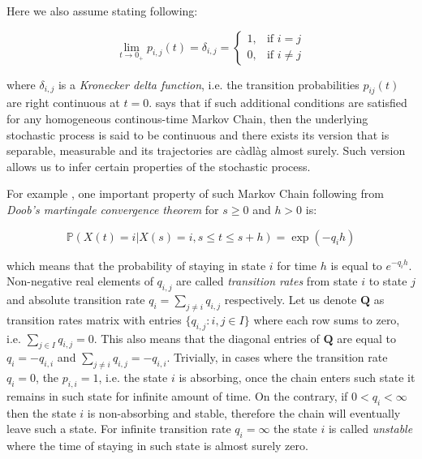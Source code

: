 Here we also assume \citep{Gallager2013} stating following:

\begin{equation}
    \lim_{t \to 0_{+}} p_{i,j}(t) = \delta_{i,j} = 
        \begin{cases}
            1, & \text{if } i = j\\
            0, & \text{if } i \neq j
        \end{cases}
\end{equation}

where $\delta_{i,j}$ is a \textit{Kronecker delta function}, i.e. the transition probabilities $p_{ij}(t)$ are right continuous at $t=0$. \citep{Norris2012} says that if such additional conditions are satisfied for any homogeneous continous-time Markov Chain, 
then the underlying stochastic process is said to be continuous and there exists its version that is separable, measurable and its trajectories are càdlàg almost surely. Such version allows us to infer 
certain properties of the stochastic process.

For example \citep{Gidi2018}, one important property of such Markov Chain following from \textit{Doob's martingale convergence theorem} for $s \geq 0$ and $h>0$ is:

\begin{equation}
    \mathbb{P}(X(t) = i|X(s)=i, s \leq t \leq s+h) = \exp(-{q_i}h)
\end{equation}

which means that the probability of staying in state $i$ for time $h$ is equal to $e^{-{q_i}h}$. 
Non-negative real elements of $q_{i,j}$ are called \textit{transition rates} from state $i$ to state $j$ and absolute transition 
rate $q_i = \sum_{j \neq i} q_{i,j}$ respectively. Let us denote $\textbf{Q}$ as transition rates matrix with entries $\{q_{i,j}: i,j \in I\}$ where each row sums to zero, i.e. $\sum_{j \in I} q_{i,j} = 0$. 
This also means that the diagonal entries of $\textbf{Q}$ are equal to $q_i = -q_{i,i}$ and $\sum_{j \neq i} q_{i,j} = -q_{i,i}$. 
Trivially, in cases where the transition rate $q_i=0$, the $p_{i,i} = 1$, i.e. the state $i$ is absorbing, 
once the chain enters such state it remains in such state for infinite amount of time. On the contrary, if $0 < q_i < \infty$ then the state $i$ is non-absorbing and stable, therefore
the chain will eventually leave such a state. For infinite transition rate $q_i = \infty$ the state $i$ is called {\it unstable} where the time of staying in such state is almost surely zero. \citep{Praskova2012}

